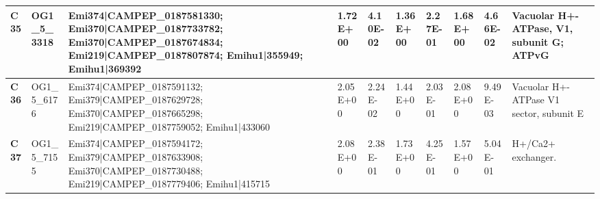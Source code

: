 \begin{landscape}
\begin{center}
\begin{footnotesize}
\begin{longtable}{|p{0.5cm}|p{1.5cm}|p{4cm}|l|l|l|l|l|l|l|}
\textbf{C35} & OG1\_5\_3318  & Emi374|CAMPEP\_0187581330; Emi370|CAMPEP\_0187733782; Emi370|CAMPEP\_0187674834; Emi219|CAMPEP\_0187807874; Emihu1|355949; Emihu1|369392                                                                                                                                                                                                                                                                                                                                                                                                                                                                                                 & 1.72E+00  & 4.10E-02 & 1.36E+00  & 2.27E-01 & 1.68E+00  & 4.66E-02 & Vacuolar H+-ATPase, V1, subunit G; ATPvG                                     \\ \hline
\textbf{C36} & OG1\_5\_6176  & Emi374|CAMPEP\_0187591132; Emi379|CAMPEP\_0187629728; Emi370|CAMPEP\_0187665298; Emi219|CAMPEP\_0187759052; Emihu1|433060                                                                                                                                                                                                                                                                                                                                                                                                                                                                                                                & 2.05E+00  & 2.24E-02 & 1.44E+00  & 2.03E-01 & 2.08E+00  & 9.49E-03 & Vacuolar H+-ATPase V1 sector, subunit E                                      \\ \hline
\textbf{C37} & OG1\_5\_7155  & Emi374|CAMPEP\_0187594172; Emi379|CAMPEP\_0187633908; Emi370|CAMPEP\_0187730488; Emi219|CAMPEP\_0187779406; Emihu1|415715                                                                                                                                                                                                                                                                                                                                                                                                                                                                                                                & 2.08E+00  & 2.38E-01 & 1.73E+00  & 4.25E-01 & 1.57E+00  & 5.04E-01 & H+/Ca2+ exchanger.                                                           \\ \hline

\end{longtable}
\end{footnotesize}
\end{center}
\end{landscape}

